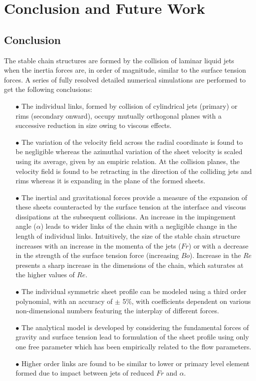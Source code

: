 \chapter{Conclusion and Future Work}
\section{Conclusion}
The stable chain structures are formed by the collision of laminar liquid jets when the inertia forces are, in order of magnitude, similar to the surface tension forces. A series of fully resolved detailed numerical simulations are performed to get the following conclusions:
\begin{enumerate}
\item [$\bullet$] The individual links, formed by collision of cylindrical jets (primary) or rims (secondary onward), occupy mutually orthogonal planes with a successive reduction in size owing to viscous effects. 
\item [$\bullet$] The variation of the velocity field across the radial coordinate is found to be negligible whereas the azimuthal variation of the sheet velocity is scaled using its average, given by an empiric relation. At the collision planes, the velocity field is found to be retracting in the direction of the colliding jets and rims whereas it is expanding in the plane of the formed sheets.
\item [$\bullet$] The inertial and gravitational forces provide a measure of the expansion of these sheets counteracted by the surface tension at the interface and viscous dissipations at the subsequent collisions. An increase in the impingement angle ($\alpha$) leads to wider links of the chain with a negligible change in the length of individual links. Intuitively, the size of the stable chain structure increases with an increase in the momenta of the jets ($Fr$) or with a decrease in the strength of the surface tension force (increasing $Bo$). Increase in the $Re$ presents a sharp increase in the dimensions of the chain, which saturates at the higher values of $Re$.
\item [$\bullet$] The individual symmetric sheet profile can be modeled using a third order polynomial, with an accuracy of $\pm$ 5\%, with coefficients dependent on various non-dimensional numbers featuring the interplay of different forces.
\item [$\bullet$] The analytical model is developed by considering the fundamental forces of gravity and surface tension lead to formulation of the sheet profile using only one free parameter which has been empirically related to the flow parameters.
\item [$\bullet$] Higher order links are found to be similar to lower or primary level element formed due to impact between jets of reduced $Fr$ and $\alpha$. 
\end{enumerate}
